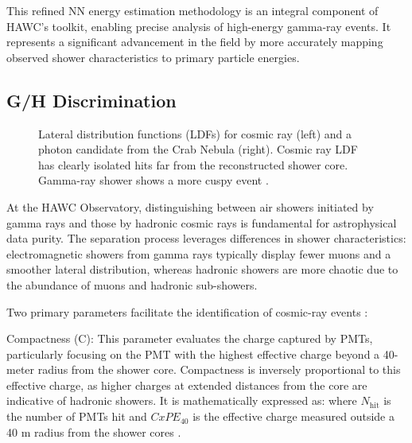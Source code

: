 This refined NN energy estimation methodology is an integral component of HAWC's toolkit, enabling precise analysis of high-energy gamma-ray events.
It represents a significant advancement in the field by more accurately mapping observed shower characteristics to primary particle energies.

\subsection{G/H Discrimination}\label{hawc:gammaHadron}

\begin{figure}
    \caption{Lateral distribution functions (LDFs) for cosmic ray (left) and a photon candidate from the Crab Nebula (right). Cosmic ray LDF has clearly isolated hits far from the reconstructed shower core. Gamma-ray shower shows a more cuspy event \cite{Abeysekara_2017}.}
    \label{fig:ldf_particleshower}
\end{figure}

At the HAWC Observatory, distinguishing between air showers initiated by gamma rays and those by hadronic cosmic rays is fundamental for astrophysical data purity.
The separation process leverages differences in shower characteristics: electromagnetic showers from gamma rays typically display fewer muons and a smoother lateral distribution, whereas hadronic showers are more chaotic due to the abundance of muons and hadronic sub-showers.

Two primary parameters facilitate the identification of cosmic-ray events \cite{Abeysekara_2017}:

Compactness (C): This parameter evaluates the charge captured by PMTs, particularly focusing on the PMT with the highest effective charge beyond a 40-meter radius from the shower core.
Compactness is inversely proportional to this effective charge, as higher charges at extended distances from the core are indicative of hadronic showers.
It is mathematically expressed as:
\compactness
where $N_\mathrm{hit}$ is the number of PMTs hit and $CxPE_{40}$ is the effective charge measured outside a 40 m radius from the shower cores \cite{Abeysekara_2017}.

